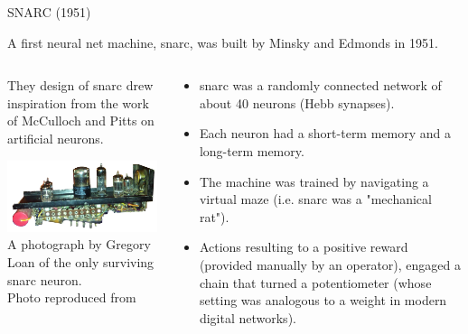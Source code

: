 
\begin{frame}[t]{SNARC (1951)} 

A first neural net machine, \gls{snarc}, 
was built by \gls{Minsky} and \gls{Edmonds} in 1951.

\begin{columns}
    \begin{column}{0.45\textwidth}
      They design of \gls{snarc} drew inspiration from the work of 
      \gls{McCulloch} and \gls{Pitts} on
      artificial neurons.           
     \begin{center}
        \includegraphics[width=0.99\textwidth]
        {./images/snarc/gregoryloan_snarc_hebbsynapse.png}\\
     {\scriptsize 
      A photograph by Gregory Loan of the only surviving \gls{snarc} neuron.\\
      \color{col:attribution} 
      Photo reproduced from \cite{CyberneticZoo:1951MazeSolver}}\\
     \end{center}
    \end{column}
    \begin{column}{0.55\textwidth}
       \begin{itemize} 
        \item
        \gls{snarc} was a randomly connected network 
        of about 40 neurons (Hebb synapses).
        \item
        Each neuron had a short-term memory and a long-term memory.
        \item
        The machine was trained by navigating a virtual maze 
        (i.e. \gls{snarc} was a "mechanical rat").
        \item
        Actions resulting to a positive reward (provided manually 
        by an operator), engaged a chain that turned a potentiometer 
        (whose setting was analogous to a weight in modern digital networks).
       \end{itemize}
    \end{column}
\end{columns}

\end{frame}